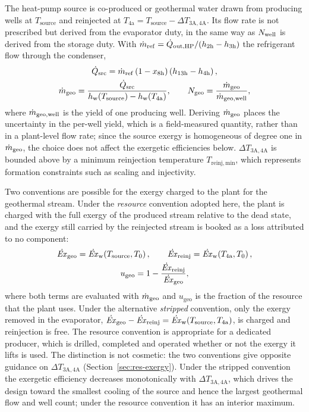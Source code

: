 The heat-pump source is co-produced or geothermal water drawn from producing
wells at $T_\mathrm{source}$ and reinjected at
$T_\mathrm{4a}=T_\mathrm{source}-\Delta T_\mathrm{3A,4A}$. Its flow rate is not
prescribed but derived from the evaporator duty, in the same way as $N_{\mathrm{well}}$ is
derived from the storage duty. With
$\dot m_\mathrm{ref}=\dot Q_\mathrm{out,HP}/(h_\mathrm{2h}-h_\mathrm{3h})$ the
refrigerant flow through the condenser,
\begin{gather}
  \dot Q_\mathrm{src}=\dot m_\mathrm{ref}\left(1-x_\mathrm{8h}\right)
     \left(h_\mathrm{13h}-h_\mathrm{4h}\right),
  \notag\\
  \dot m_\mathrm{geo}=\frac{\dot Q_\mathrm{src}}
     {h_\mathrm{w}(T_\mathrm{source})-h_\mathrm{w}(T_\mathrm{4a})},
  \qquad
  N_\mathrm{geo}=\frac{\dot m_\mathrm{geo}}{\dot m_\mathrm{geo,well}},
  \label{eq:mgeo}
\end{gather}
where $\dot m_\mathrm{geo,well}$ is the yield of one producing well. Deriving
$\dot m_\mathrm{geo}$ places the uncertainty in the per-well yield, which is a
field-measured quantity, rather than in a plant-level flow rate; since the
source exergy is homogeneous of degree one in $\dot m_\mathrm{geo}$, the choice
does not affect the exergetic efficiencies below. $\Delta T_\mathrm{3A,4A}$ is
bounded above by a minimum reinjection temperature
$T_\mathrm{reinj,min}$, which represents formation constraints such as scaling
and injectivity.

Two conventions are possible for the exergy charged to the plant for the
geothermal stream. Under the \emph{resource} convention adopted here, the plant
is charged with the full exergy of the produced stream relative to the dead
state, and the exergy still carried by the reinjected stream is booked as a
loss attributed to no component:
\begin{gather}
  \dot{\mathit{Ex}}_\mathrm{geo}=\dot{\mathit{Ex}}_\mathrm{w}\!\left(T_\mathrm{source},T_0\right),
  \qquad
  \dot{\mathit{Ex}}_\mathrm{reinj}=\dot{\mathit{Ex}}_\mathrm{w}\!\left(T_\mathrm{4a},T_0\right),
  \notag\\
  u_\mathrm{geo}=1-\frac{\dot{\mathit{Ex}}_\mathrm{reinj}}{\dot{\mathit{Ex}}_\mathrm{geo}},
  \label{eq:ex-geo}
\end{gather}
where both terms are evaluated with $\dot m_\mathrm{geo}$ and $u_\mathrm{geo}$ is
the fraction of the resource that the plant uses. Under the alternative
\emph{stripped} convention, only the exergy removed in the evaporator,
$\dot{\mathit{Ex}}_\mathrm{geo}-\dot{\mathit{Ex}}_\mathrm{reinj}=\dot{\mathit{Ex}}_\mathrm{w}(T_\mathrm{source},
T_\mathrm{4a})$, is charged and reinjection is free. The resource convention is
appropriate for a dedicated producer, which is drilled, completed and operated
whether or not the exergy it lifts is used. The distinction is not cosmetic:
the two conventions give opposite guidance on $\Delta T_\mathrm{3A,4A}$
(Section~\ref{sec:res-exergy}). Under the stripped convention the exergetic
efficiency decreases monotonically with $\Delta T_\mathrm{3A,4A}$, which drives
the design toward the smallest cooling of the source and hence the largest
geothermal flow and well count; under the resource convention it has an
interior maximum.

